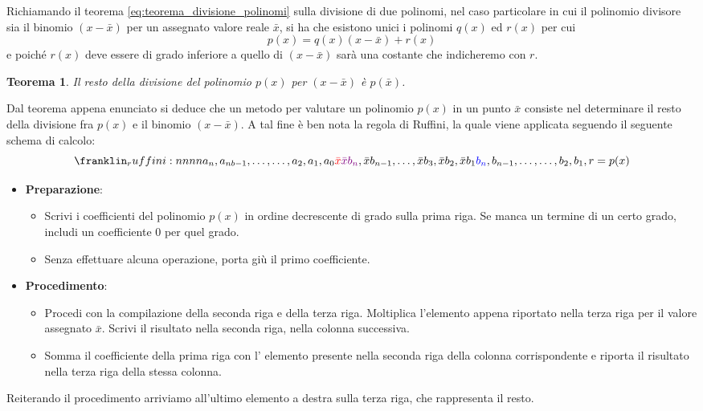 \documentclass{article}
\newtheorem*{theorem}{\color{green}\textbf{Teorema}}
\numberwithin{equation}{section}
\begin{document}
Richiamando il teorema \ref{eq:teorema_divisione_polinomi} sulla divisione di
due polinomi, nel caso particolare in cui il polinomio divisore sia il
binomio $(x-\bar{x})$ per un assegnato valore reale $\bar{x}$, si ha che
esistono unici i polinomi $q(x)$ ed $r(x)$ per cui 
$$p(x)=q(x)(x-\bar{x})+r(x)$$
e poiché $r(x)$ deve essere di grado inferiore a quello di $(x-\bar{x})$ sarà
una costante che indicheremo con $r$.
\begin{theorem}
    Il resto della divisione del polinomio $p(x)$ per $(x-\bar{x})$ è $p(\bar{x})$.
\end{theorem}
Dal teorema appena enunciato si deduce che un metodo per valutare un polinomio
$p(x)$ in un punto $\bar{x}$ consiste nel determinare il resto della divisione
fra $p(x)$ e il binomio $(x-\bar{x})$. A tal fine è ben nota la regola di
Ruffini, la quale viene applicata seguendo il seguente schema di calcolo:
$$\ruffini{a_n,a_{nb-1},\ldots,\ldots,a_2,a_1,a_0}{\color{red}\bar{x}}{{\color{violet}\bar{x}b_n},\bar{x}b_{n-1},\ldots,\bar{x}b_3,\bar{x}b_2,\bar{x}b_1}{{\color{blue}b_n},
b_{n-1},\ldots,\ldots,b_2,b_1,r=p(x)}$$
\begin{itemize}
    \item \textbf{Preparazione}:
    \begin{itemize}
        \item Scrivi i coefficienti del polinomio $p(x)$ in ordine decrescente di
            grado sulla prima riga. Se manca un termine di un certo grado,
            includi un coefficiente 0 per quel grado.
        \item Senza effettuare alcuna operazione, porta giù il primo coefficiente.
    \end{itemize}
    \item \textbf{Procedimento}:
    \begin{itemize}
        \item Procedi con la compilazione della seconda riga e della terza riga.
            Moltiplica {\color{blue} l'elemento} appena riportato nella terza riga per il
            {\color{red} valore assegnato $\bar{x}$}. Scrivi il {\color{violet}risultato} 
            nella seconda riga, nella colonna successiva. 
        \item Somma il coefficiente della prima riga con l'
            {\color{violet}elemento} presente nella seconda riga della colonna
            corrispondente e riporta il risultato nella terza riga della stessa
            colonna.
    \end{itemize}
\end{itemize}
Reiterando il procedimento arriviamo all'ultimo elemento a destra sulla terza riga, 
che rappresenta il resto.
\end{document}
